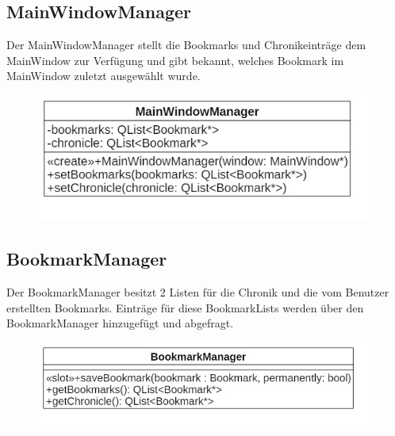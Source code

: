 \subsection*{MainWindowManager}
Der MainWindowManager stellt die Bookmarks und Chronikeinträge dem MainWindow zur Verfügung und gibt bekannt, welches Bookmark im MainWindow zuletzt ausgewählt wurde.

\begin{figure}[H]
\centering
\includegraphics[scale=0.5]{img/Klassendiagramm/Klassen/MainWindowManager}
\label{fig:mainWindowManager}
\end{figure}

\subsection*{BookmarkManager}
Der BookmarkManager besitzt 2 Listen für die Chronik und die vom Benutzer erstellten Bookmarks. Einträge für diese BookmarkLists werden über den BookmarkManager hinzugefügt und abgefragt.

\begin{figure}[H]
\centering
\includegraphics[scale=0.5]{img/Klassendiagramm/Klassen/BookmarkManager}
\label{fig:bookmarkManager}
\end{figure}
